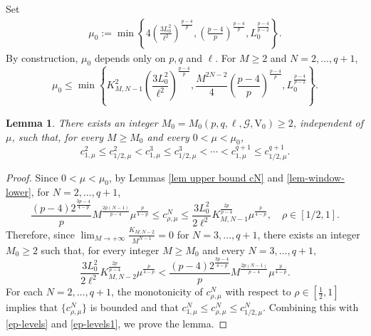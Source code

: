 \documentclass[11pt]{amsart}
\newtheorem{lemma}[theorem]{Lemma}
\newcommand{\G}{\mathcal{G}}
\newcommand{\V}{\mathrm{V}}
\numberwithin{equation}{section}
\begin{document}
Set
$$
\begin{aligned}
    \mu_0:=\min{\left\{4\left(\frac{3L_0^2}{\ell^2}\right)^\frac{p-4}{p},\left( \frac{p-4}{p} \right)^{\frac{p-4}{p}},L_0^\frac{p-4}{p-2}\right\}}.
\end{aligned}
$$
By construction, $\mu_0$ depends only on $p,q$ and $\ell$. For $M \geq2$ and $N=2,\ldots,q+1$,
$$
    \mu_0 \leq \min\left\{K^{2}_{M,N-1}\left(\frac{3L_0^2}{\ell^2}\right)^\frac{p-4}{p},\frac{ M^{2N-2}}{4} \left( \frac{p-4}{p} \right)^{\frac{p-4}{p}},L_0^\frac{p-4}{p-2}\right\}.
$$
\begin{lemma}\label{prop-windows}
There exists an integer \(M_0=M_0(p,q,\ell,\G,\V_0)\geq2\), independent of \(\mu\), such that,
for every \(M\geq M_0\) and every \(0<\mu<\mu_0\),
\begin{equation}\label{sep-levels}
c_{1,\mu}^2\leq c_{1/2,\mu}^2
<
c_{1,\mu}^3\leq c_{1/2,\mu}^3
<
\cdots
<
c_{1,\mu}^{q+1}\leq c_{1/2,\mu}^{q+1}.
\end{equation}
\end{lemma}
\begin{proof}
Since $0< \mu < \mu_0$, by Lemmas \ref{lem upper bound cN} and \ref{lem-window-lower}, for $N=2,\ldots,q+1$,
\begin{equation}\label{ep-levels}
 \frac{(p-4)2^{\frac{3p-4}{4-p}}}{p}M^{\frac{2p(N-1)}{p-4}}\mu^{\frac{p}{4-p}}\le c_{\rho,\mu}^N
\leq
\frac{3L_0^2}{2\ell^2}K^{\frac{2p}{p-4}}_{M,N-1}
\mu^\frac{p}{4-p}, \quad \rho\in [1/2,1].
\end{equation}
Therefore, since $\displaystyle\lim_{M \to +\infty}\frac{K_{M,N-2}}{M^{N-1}}= 0$ for $N  =3,\ldots,q+1$, there exists  an integer $M_0 \geq 2$ such that, for every integer $M \geq M_0$ and every $N  =3,\ldots,q+1$, 
\begin{equation}\label{ep-levels1}
\frac{3L_0^2}{2\ell^2}K^{\frac{2p}{p-4}}_{M,N-2}
\mu^\frac{p}{4-p}<\frac{(p-4)2^{\frac{3p-4}{4-p}}}{p}M^{\frac{2p(N-1)}{p-4}}\mu^{\frac{p}{4-p}}.
\end{equation}
For each $N =2,\ldots,q+1$, the monotonicity of $c_{\rho,\mu}^N$ with respect to $\rho\in [\frac{1}{2},1]$ implies that $\{c_{\rho,\mu}^N\}$ is bounded and that $c_{1,\mu}^N\leq c_{\rho,\mu}^N \leq c_{1/2,\mu}^N$. Combining this with \eqref{ep-levels} and \eqref{ep-levels1}, we prove the lemma.
\end{proof}
\end{document}
